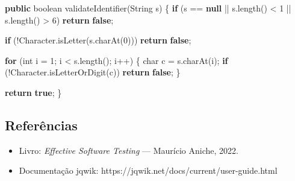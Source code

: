 \documentclass[
  letterpaper,
  DIV=11,
  numbers=noendperiod]{scrartcl}
\newenvironment{Shaded}{\begin{snugshade}}{\end{snugshade}}
\newcommand{\BuiltInTok}[1]{\textcolor[rgb]{0.00,0.23,0.31}{#1}}
\newcommand{\ControlFlowTok}[1]{\textcolor[rgb]{0.00,0.23,0.31}{\textbf{#1}}}
\newcommand{\DataTypeTok}[1]{\textcolor[rgb]{0.68,0.00,0.00}{#1}}
\newcommand{\DecValTok}[1]{\textcolor[rgb]{0.68,0.00,0.00}{#1}}
\newcommand{\FunctionTok}[1]{\textcolor[rgb]{0.28,0.35,0.67}{#1}}
\newcommand{\KeywordTok}[1]{\textcolor[rgb]{0.00,0.23,0.31}{\textbf{#1}}}
\newcommand{\NormalTok}[1]{\textcolor[rgb]{0.00,0.23,0.31}{#1}}
\newcommand{\OperatorTok}[1]{\textcolor[rgb]{0.37,0.37,0.37}{#1}}
\providecommand{\tightlist}{%
  \setlength{\itemsep}{0pt}\setlength{\parskip}{0pt}}
\begin{document}
\begin{Shaded}
\begin{Highlighting}[]
\KeywordTok{public} \DataTypeTok{boolean} \FunctionTok{validateIdentifier}\OperatorTok{(}\BuiltInTok{String}\NormalTok{ s}\OperatorTok{)} \OperatorTok{\{}
    \ControlFlowTok{if} \OperatorTok{(}\NormalTok{s }\OperatorTok{==} \KeywordTok{null} \OperatorTok{||}\NormalTok{ s}\OperatorTok{.}\FunctionTok{length}\OperatorTok{()} \OperatorTok{\textless{}} \DecValTok{1} \OperatorTok{||}\NormalTok{ s}\OperatorTok{.}\FunctionTok{length}\OperatorTok{()} \OperatorTok{\textgreater{}} \DecValTok{6}\OperatorTok{)}
        \ControlFlowTok{return} \KeywordTok{false}\OperatorTok{;}

    \ControlFlowTok{if} \OperatorTok{(!}\BuiltInTok{Character}\OperatorTok{.}\FunctionTok{isLetter}\OperatorTok{(}\NormalTok{s}\OperatorTok{.}\FunctionTok{charAt}\OperatorTok{(}\DecValTok{0}\OperatorTok{)))}
        \ControlFlowTok{return} \KeywordTok{false}\OperatorTok{;}

    \ControlFlowTok{for} \OperatorTok{(}\DataTypeTok{int}\NormalTok{ i }\OperatorTok{=} \DecValTok{1}\OperatorTok{;}\NormalTok{ i }\OperatorTok{\textless{}}\NormalTok{ s}\OperatorTok{.}\FunctionTok{length}\OperatorTok{();}\NormalTok{ i}\OperatorTok{++)} \OperatorTok{\{}
        \DataTypeTok{char}\NormalTok{ c }\OperatorTok{=}\NormalTok{ s}\OperatorTok{.}\FunctionTok{charAt}\OperatorTok{(}\NormalTok{i}\OperatorTok{);}
        \ControlFlowTok{if} \OperatorTok{(!}\BuiltInTok{Character}\OperatorTok{.}\FunctionTok{isLetterOrDigit}\OperatorTok{(}\NormalTok{c}\OperatorTok{))}
            \ControlFlowTok{return} \KeywordTok{false}\OperatorTok{;}
    \OperatorTok{\}}

    \ControlFlowTok{return} \KeywordTok{true}\OperatorTok{;}
\OperatorTok{\}}
\end{Highlighting}
\end{Shaded}

\subsection{Referências}\label{referuxeancias}

\begin{itemize}
\tightlist
\item
  Livro: \emph{Effective Software Testing} --- Maurício Aniche, 2022.
\item
  Documentação jqwik: https://jqwik.net/docs/current/user-guide.html
\end{itemize}
\end{document}
